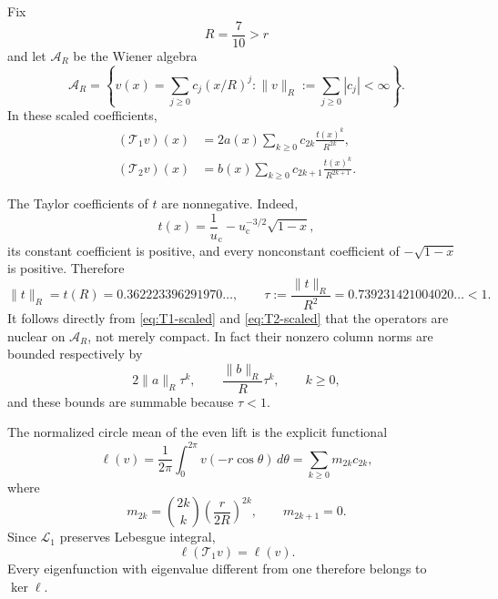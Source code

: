 \documentclass[11pt]{article}
\theoremstyle{definition}
\theoremstyle{remark}
\newcommand{\uc}{u_{\mathrm c}}
\newcommand{\cA}{\mathcal A}
\newcommand{\cL}{\mathcal L}
\newcommand{\cT}{\mathcal T}
\begin{document}
Fix
\begin{equation}\label{eq:R-choice}
 R=\frac7{10}>r
\end{equation}
and let $\cA_R$ be the Wiener algebra
\begin{equation}\label{eq:wiener-space}
 \cA_R=\left\{
 v(x)=\sum_{j\ge0}c_j(x/R)^j:
 \|v\|_R:=\sum_{j\ge0}|c_j|<\infty
 \right\}.
\end{equation}
In these scaled coefficients,
\begin{align}
 (\cT_1v)(x)
 &=2a(x)\sum_{k\ge0}c_{2k}\frac{t(x)^k}{R^{2k}},
 \label{eq:T1-scaled}\\
 (\cT_2v)(x)
 &=b(x)\sum_{k\ge0}c_{2k+1}\frac{t(x)^k}{R^{2k+1}}.
 \label{eq:T2-scaled}
\end{align}

The Taylor coefficients of $t$ are nonnegative.  Indeed,
\begin{equation}\label{eq:t-positive}
 t(x)=\frac1\uc-\uc^{-3/2}\sqrt{1-x},
\end{equation}
its constant coefficient is positive, and every nonconstant coefficient of
$-\sqrt{1-x}$ is positive.  Therefore
\begin{equation}\label{eq:t-norm}
 \|t\|_R=t(R)=0.362223396291970\ldots,
 \qquad
 \tau:=\frac{\|t\|_R}{R^2}
 =0.739231421004020\ldots<1.
\end{equation}
It follows directly from \eqref{eq:T1-scaled} and \eqref{eq:T2-scaled} that the operators
are nuclear on $\cA_R$, not merely compact.  In fact their nonzero column
norms are bounded respectively by
\begin{equation}\label{eq:full-column-decay}
 2\|a\|_R\tau^k,
 \qquad
 \frac{\|b\|_R}{R}\tau^k,
 \qquad k\ge0,
\end{equation}
and these bounds are summable because $\tau<1$.

The normalized circle mean of the even lift is the explicit functional
\begin{equation}\label{eq:mean-functional}
 \ell(v)=\frac1{2\pi}\int_0^{2\pi}v(-r\cos\theta)\,d\theta
 =\sum_{k\ge0}m_{2k}c_{2k},
\end{equation}
where
\begin{equation}\label{eq:moments}
 m_{2k}=\binom{2k}{k}\left(\frac{r}{2R}\right)^{2k},
 \qquad m_{2k+1}=0.
\end{equation}
Since $\cL_1$ preserves Lebesgue integral,
\begin{equation}\label{eq:mean-invariance}
 \ell(\cT_1v)=\ell(v).
\end{equation}
Every eigenfunction with eigenvalue different from one therefore belongs to
$\ker\ell$.
\end{document}
